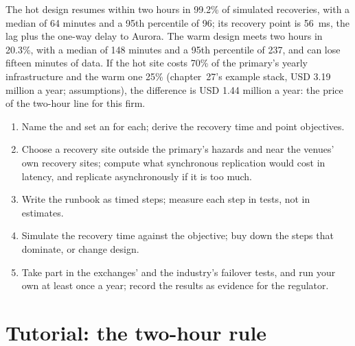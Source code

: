 The hot design resumes within two hours in 99.2\% of simulated recoveries, with a median of 64 minutes and a 95th percentile of 96; its
recovery point is \qty{56}{\milli\second}, the lag plus the one-way delay to Aurora. The warm design meets two hours in 20.3\%, with a
median of 148 minutes and a 95th percentile of 237, and can lose fifteen minutes of data. If the hot site costs 70\% of the primary's
yearly infrastructure and the warm one 25\% (chapter~27's example stack, USD 3.19 million a year; assumptions), the difference is USD
1.44 million a year: the price of the two-hour line for this firm.

\begin{method}\label{met:nw:disaster-recovery-and-regulatory-requirements:design}
\begin{enumerate}
\item Name the  and set an  for each; derive the recovery time and point objectives.
\item Choose a recovery site outside the primary's hazards and near the venues' own recovery sites; compute what synchronous
  replication would cost in latency, and replicate asynchronously if it is too much.
\item Write the runbook as timed steps; measure each step in tests, not in estimates.
\item Simulate the recovery time against the objective; buy down the steps that dominate, or change design.
\item Take part in the exchanges' and the industry's failover tests, and run your own at least once a year; record the results as
  evidence for the regulator.
\end{enumerate}
\end{method}

\section{Tutorial: the two-hour rule}\label{tut:nw:disaster-recovery-and-regulatory-requirements:tut}

